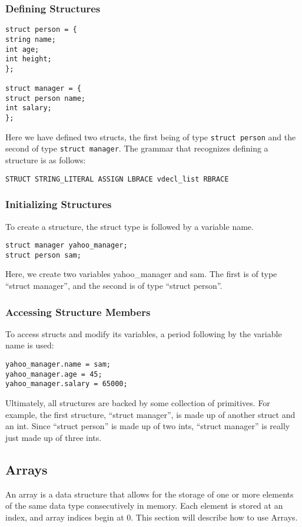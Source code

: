 \documentclass{article}
\begin{document}
\subsubsection{Defining Structures}

\begin{lstlisting}
struct person = {
string name;
int age;
int height;
};

struct manager = {
struct person name;
int salary;
};
\end{lstlisting}
Here we have defined two structs, the first being of type \texttt{struct person} and the second of type \texttt{struct manager}.  The grammar that recognizes defining a structure is as follows:

\begin{Verbatim}[frame=single]
STRUCT STRING_LITERAL ASSIGN LBRACE vdecl_list RBRACE
\end{Verbatim}

\subsubsection{Initializing Structures}
To create a structure, the struct type is followed by a variable name. 
\begin{lstlisting}
struct manager yahoo_manager;
struct person sam;
\end{lstlisting}

Here, we create two variables yahoo\_manager and sam. The first is of type ``struct manager'', and the second is of type ``struct person''.

\subsubsection{Accessing Structure Members}

 To access structs and modify its variables, a period following by the variable name is used:

 \begin{lstlisting}
yahoo_manager.name = sam;
yahoo_manager.age = 45;
yahoo_manager.salary = 65000;
\end{lstlisting}

Ultimately, all structures are backed by some collection of primitives. For example, the first structure, ``struct manager'', is made up of another struct and an int. Since ``struct person'' is made up of two ints, ``struct manager'' is really just made up of three ints. 


\subsection{Arrays}
An array is a data structure that allows for the storage of one or more elements of the same data type consecutively in memory. Each element is stored at an index, and array indices begin at 0. This section will describe how to use Arrays.
\end{document}
